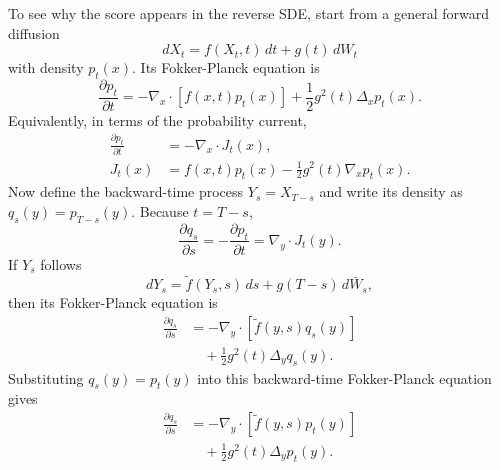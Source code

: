 \documentclass[reprint,amsmath,amssymb,aps,pra,10pt]{revtex4-2}
\begin{document}
To see why the score appears in the reverse SDE, start from a general forward diffusion \cite{anderson1982,song2021}
\begin{equation}
    dX_t
    =
    f(X_t,t)\,dt
    +
    g(t)\,dW_t
\end{equation}
with density $p_t(x)$.
Its Fokker-Planck equation is
\begin{equation}
    \frac{\partial p_t}{\partial t}
    =
    -
    \nabla_x\cdot
    \left[
        f(x,t)p_t(x)
    \right]
    +
    \frac{1}{2}
    g^2(t)\Delta_x p_t(x).
\end{equation}
Equivalently, in terms of the probability current,
\begin{equation}
    \begin{aligned}
        \frac{\partial p_t}{\partial t}
        &=
        -
        \nabla_x\cdot J_t(x),
        \\
        J_t(x)
        &=
        f(x,t)p_t(x)
        -
        \frac{1}{2}
        g^2(t)\nabla_x p_t(x).
    \end{aligned}
\end{equation}
Now define the backward-time process $Y_s=X_{T-s}$ and write its density as $q_s(y)=p_{T-s}(y)$.
Because $t=T-s$,
\begin{equation}
    \frac{\partial q_s}{\partial s}
    =
    -
    \frac{\partial p_t}{\partial t}
    =
    \nabla_y\cdot J_t(y).
\end{equation}
If $Y_s$ follows
\begin{equation}
    dY_s
    =
    \tilde f(Y_s,s)\,ds
    +
    g(T-s)\,d\bar W_s,
\end{equation}
then its Fokker-Planck equation is
\begin{equation}
    \begin{aligned}
        \frac{\partial q_s}{\partial s}
        &=
        -
        \nabla_y\cdot
        \left[
            \tilde f(y,s)q_s(y)
        \right]
        \\
        &\quad
        +
        \frac{1}{2}
        g^2(t)\Delta_y q_s(y).
    \end{aligned}
\end{equation}
Substituting $q_s(y)=p_t(y)$ into this backward-time Fokker-Planck equation gives
\begin{equation}
    \begin{aligned}
        \frac{\partial q_s}{\partial s}
        &=
        -
        \nabla_y\cdot
        \left[
            \tilde f(y,s)p_t(y)
        \right]
        \\
        &\quad
        +
        \frac{1}{2}
        g^2(t)\Delta_y p_t(y).
    \end{aligned}
\end{equation}
\end{document}
